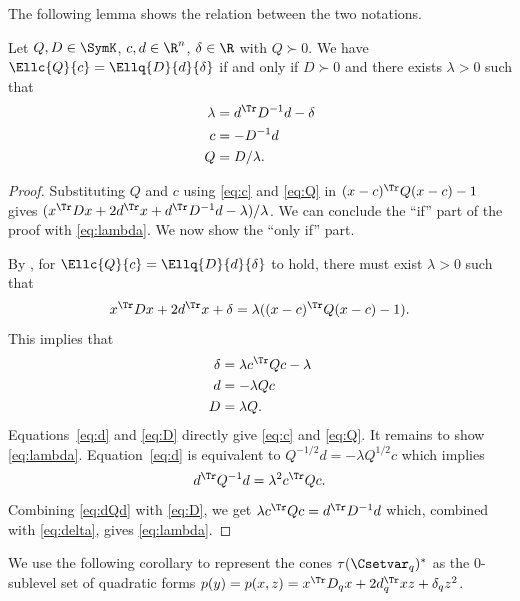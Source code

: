 \documentclass[11pt,twoside,a4paper,openright]{uclouvain-thesis}
\begin{document}
The following lemma shows the relation between the two notations.
\begin{myprop}
  \label{prop:QD}
  Let $Q, D \in \SymK$, $c, d \in \R^n$, $\delta \in \R$ with $Q \succ 0$.
  We have $\Ellc{Q}{c} = \Ellq{D}{d}{\delta}$ if and only if $D \succ 0$ and there exists $\lambda > 0$ such that
  \begin{align}
    \label{eq:lambda}
    \lambda & = d^\Tr D^{-1} d - \delta\\
    \label{eq:c}
    c & = -D^{-1}d\\
    \label{eq:Q}
    Q & = D/\lambda.
  \end{align}
  \begin{proof}
    Substituting $Q$ and $c$ using \eqref{eq:c} and \eqref{eq:Q} in $(x-c)^\Tr Q (x-c) - 1$ gives $(x^\Tr D x + 2d^\Tr x + d^\Tr D^{-1} d - \lambda) / \lambda$.
    We can conclude the ``if'' part of the proof with \eqref{eq:lambda}.
    We now show the ``only if'' part.

    By , for $\Ellc{Q}{c} = \Ellq{D}{d}{\delta}$ to hold, there must exist $\lambda > 0$ such that
    \[ x^\Tr D x + 2d^\Tr x + \delta = \lambda((x-c)^\Tr Q (x-c) - 1). \]
    This implies that
    \begin{align}
      \label{eq:delta}
      \delta & = \lambda c^\Tr Q c - \lambda\\
      \label{eq:d}
      d & = -\lambda Qc\\
      \label{eq:D}
      D & = \lambda Q.
    \end{align}
    Equations~\eqref{eq:d} and \eqref{eq:D} directly give \eqref{eq:c} and \eqref{eq:Q}.
    It remains to show \eqref{eq:lambda}.
    Equation~\eqref{eq:d} is equivalent to $Q^{-1/2}d = -\lambda Q^{1/2}c$ which implies
    \begin{equation}
      \label{eq:dQd}
      d^\Tr Q^{-1} d = \lambda^2 c^\Tr Q c.
    \end{equation}
    Combining \eqref{eq:dQd} with \eqref{eq:D}, we get $\lambda c^\Tr Q c = d^\Tr D^{-1} d$
    which, combined with \eqref{eq:delta}, gives \eqref{eq:lambda}.
  \end{proof}
\end{myprop}

We use the following corollary to represent the cones $\tau(\Csetvar_q)^*$ as the 0-sublevel set of quadratic forms $p(y) = p(x, z) = x^\Tr D_q x + 2d_q^\Tr xz + \delta_q z^2$.
\end{document}
